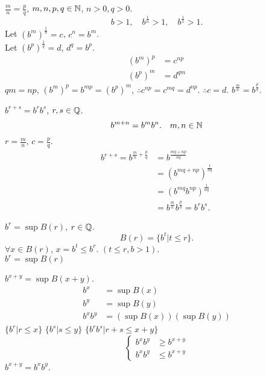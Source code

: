 \begin{asparaenum}[(a)]
        \item $\frac{m}{n} = \frac{p}{q}$, $m,n,p,q \in {\protect\mathbb N}$, $n>0,q>0$.
        \begin{equation*}
            b>1, \quad
            b^{\frac{1}{n}}>1, \quad
            b^{\frac{1}{1}}>1.
        \end{equation*}
        Let $(b^m)^{\frac{1}{n}} = c$, $c^n = b^m$.\\
        Let $(b^p)^{\frac{1}{q}} = d$, $d^q = b^p$.\\
        \begin{align*}
            (b^m)^p &= c^{np}\\
            (b^p)^m &= d^{qm}
        \end{align*}
        $qm = np$, $(b^m)^p = b^{mp} = (b^p)^m$,
        $\therefore c^{np} = c^{mq} = d^{np}$.
        $\therefore c = d$. $b^{\frac{m}{n}} = b^{\frac{p}{q}}$.
        \item $b^{r+s} = b^r b^s$, $r, s \in {\protect\mathbb Q}$.
        \begin{equation*}
            b^{m+n} = b^m b^n. 
            \quad m,n \in {\protect\mathbb N}
        \end{equation*}
        $r = \frac{m}{n}$, $c = \frac{p}{q}$.
        \begin{align*}
            b^{r+s} = b^{\frac{m}{n} + \frac{p}{q}}
            &= b^{\frac{mq+np}{nq}} \\
            &= \left( b^{mq+np} \right)^{\frac{1}{nq}} \\
            &= \left( b^{mq} b^{np} \right)^{\frac{1}{nq}} \\
            &= b^{\frac{m}{n}} b^{\frac{p}{q}}  = b^r b^s.
        \end{align*}
        \item $b^r = \sup B(r)$, $r \in {\protect\mathbb Q}$.
        \begin{equation*}
            B(r) = \{b^t | t \leq r\}.
        \end{equation*}
        $\forall x \in B(r)$, $x = b^t \leq b^r$. $(t \leq r, b > 1)$.\\
        $b^r = \sup B(r)$
        \item $b^{x+y} = \sup B(x+y)$.
        \begin{align*}
            b^x &= \sup B(x) \\
            b^y &= \sup B(y) \\
            b^x b^y &= \left( \sup B(x) \right) \left( \sup B(y) \right)
        \end{align*}
        $\{b^r| r\leq x\}$
        $\{b^s| s\leq y\}$
        $\{b^r b^s| r+s\leq x+y\}$
        \begin{equation*}
            \left\{ \begin{array}{ll}
                b^x b^y &\geq b^{x+y} \\
                b^x b^y &\leq b^{x+y}
            \end{array} \right.
        \end{equation*}
        $b^{x+y} = b^x b^y$.
        \item 
    \end{asparaenum}


